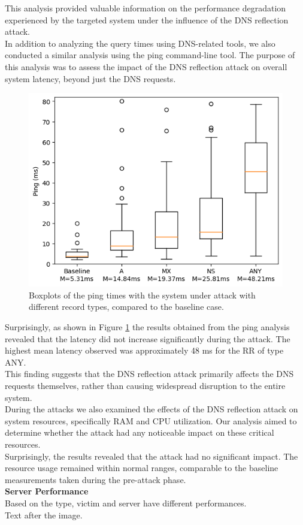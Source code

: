 This analysis provided valuable information on the performance degradation experienced by the targeted system under the influence of the DNS reflection attack.\\
In addition to analyzing the query times using DNS-related tools, we also conducted a similar analysis using the ping command-line tool. The purpose of this analysis was to assess the impact of the DNS reflection attack on overall system latency, beyond just the DNS requests.\\
\begin{figure}[H]
    \centering
    \includegraphics[width=\columnwidth]{Sections/Images/Boxplots_Ping.png}
    \caption{Boxplots of the ping times with the system under attack with different record types, compared to the baseline case.}
    \label{fig:Boxplots_Ping1}
\end{figure}
Surprisingly, as shown in Figure \ref{fig:Boxplots_Ping1} the results obtained from the ping analysis revealed that the latency did not increase significantly during the attack. The highest mean latency observed was approximately 48 ms for the RR of type ANY. \\
This finding suggests that the DNS reflection attack primarily affects the DNS requests themselves, rather than causing widespread disruption to the entire system.\\
During the attacks we also examined the effects of the DNS reflection attack on system resources, specifically RAM and CPU utilization. Our analysis aimed to determine whether the attack had any noticeable impact on these critical resources.\\
Surprisingly, the results revealed that the attack had no significant impact. The resource usage remained within normal ranges, comparable to the baseline measurements taken during the pre-attack phase.\\
\noindent \textbf{Server Performance}\\
Based on the type, victim and server have different performances.\\
\noindent Text after the image.\\
